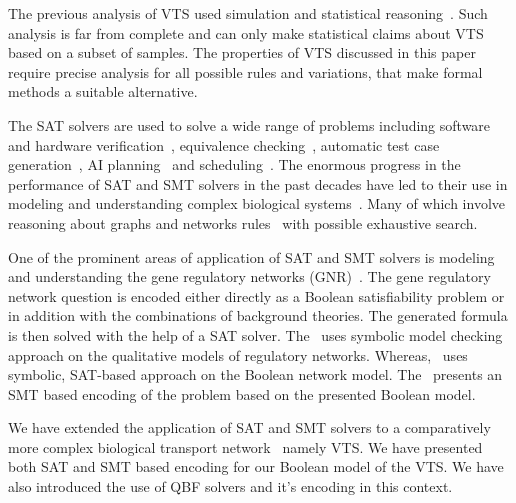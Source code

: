 \noindent The previous analysis of VTS used simulation and statistical reasoning~\cite{mani2016stacking}. 
%
Such analysis is far from complete and can only make statistical claims about VTS based on a subset of samples. 
%
The properties of VTS discussed in this paper require precise analysis for all possible rules and variations, that make formal methods a suitable alternative.

The SAT solvers are used to solve a wide range of problems including
%
software and hardware verification~\cite{biere1999symbolic1, biere1999symbolic2, bjesse2001finding, velev2003effective}, equivalence checking~\cite{goldberg2001using}, automatic test case generation~\cite{stephan1996combinational},
AI planning~\cite{kautz1996pushing} and scheduling~\cite{gomes1998randomization}. 
%
The enormous progress in the performance of SAT and SMT solvers
in the past decades have led to their use in modeling and understanding complex biological systems~\cite{heule2010exact,yordanov2013smt,mangla2010timing}. 
%
Many of which involve reasoning about graphs and networks rules~\cite{guerra2012reasoning,chin2008biographe} with possible exhaustive search.
%

One of the prominent areas of application of SAT and SMT solvers is modeling and understanding the gene regulatory networks (GNR)~\cite{giacobbe2015model,rosenblueth2014inference, yordanov2016method, dunn2014defining, paoletti2014analyzing, koksal2013synthesis}.
%
The gene regulatory network question is encoded either directly as a Boolean satisfiability problem or in addition with the combinations of background theories.
%
The generated formula is then solved with the help of a SAT solver. 
%
The~\cite{rosenblueth2014inference} uses symbolic model checking approach on the qualitative
models of regulatory networks.
%
Whereas,~\cite{dunn2014defining}  uses symbolic, SAT-based approach on the Boolean network model. 
%
The~\cite{giacobbe2015model, yordanov2016method} presents an SMT based encoding of the problem based on the presented Boolean model.
%

We have extended the application of SAT and SMT solvers to a comparatively more complex biological transport network~\cite{mani2016stacking} namely VTS. 
%
We have presented both SAT and SMT based encoding for our Boolean model of the VTS.
%
We have also introduced the use of QBF solvers and it's encoding in this context.
% 

